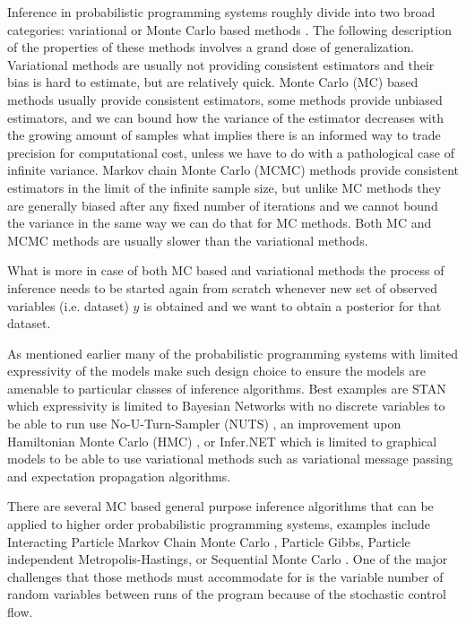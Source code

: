 \documentclass[12pt]{article}
\begin{document}
Inference in probabilistic programming systems roughly divide into two broad categories: variational \citep{WainwrightJordan2008} or Monte Carlo based methods \citep{mcbook}.
The following description of the properties of these methods involves a grand dose of generalization.
Variational methods are usually not providing consistent estimators and their bias is hard to estimate, but are relatively quick.
Monte Carlo (MC) based methods usually provide consistent estimators, some methods provide unbiased estimators, and we can bound how the variance of the estimator decreases with the growing amount of samples what implies there is an informed way to trade precision for computational cost, unless we have to do with a pathological case of infinite variance. 
Markov chain Monte Carlo (MCMC) methods provide consistent estimators in the limit of the infinite sample size, but unlike MC methods they are generally biased after any fixed number of iterations \citep{JacobEtAl2017} and we cannot bound the variance in the same way we can do that for MC methods.
Both MC and MCMC methods are usually slower than the variational methods.

What is more in case of both MC based and variational methods the process of inference needs to be started again from scratch whenever new set of observed variables (i.e. dataset) $y$ is obtained and we want to obtain a posterior for that dataset.  

As mentioned earlier many of the probabilistic programming systems with limited expressivity of the models make such design choice to ensure the models are amenable to particular classes of inference algorithms. 
Best examples are STAN which expressivity is limited to Bayesian Networks with no discrete variables to be able to run use No-U-Turn-Sampler (NUTS) \citep{NUTS}, an improvement upon Hamiltonian Monte Carlo (HMC) \citep{HMC}, or Infer.NET which is limited to graphical models to be able to use variational methods such as variational message passing \citep{variationalmessagepassing} and expectation propagation \citep{EP} algorithms.

There are several MC based general purpose inference algorithms that can be applied to higher order probabilistic programming systems, examples include Interacting Particle Markov Chain Monte Carlo \citep{rainforth2016interacting}, Particle Gibbs, Particle independent Metropolis-Hastings, or Sequential Monte Carlo \citep{WoodEtAl2014}.
One of the major challenges that those methods must accommodate for is the variable number of random variables between runs of the program because of the stochastic control flow.  
\end{document}
